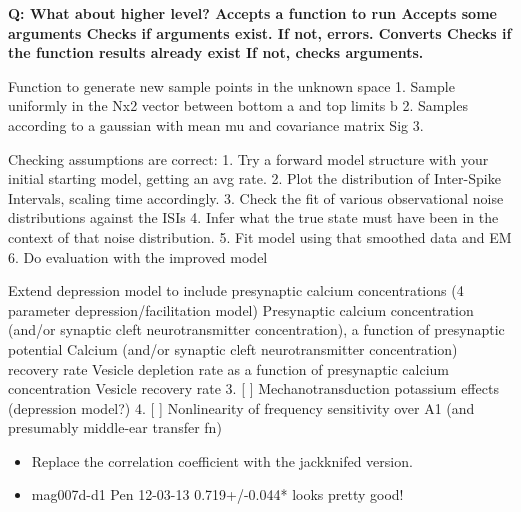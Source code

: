 \documentclass{article}
\newenvironment{qanda}{\setlength{\parindent}{0pt}}{\bigskip}
\newcommand{\Q}{\bigskip\bfseries Q: }
\begin{document}
\begin{qanda}
\Q What about higher level?
     Accepts a function to run
     Accepts some arguments
     Checks if arguments exist. If not, errors. 
     Converts 
     Checks if the function results already exist
     If not, checks arguments.
   
Function to generate new sample points in the unknown space
1. Sample uniformly in the Nx2 vector between bottom a and top limits b
2. Samples according to a gaussian with mean mu and covariance matrix Sig
3.  

Checking assumptions are correct:
   1. Try a forward model structure with your initial starting model, getting an avg rate. 
   2. Plot the distribution of Inter-Spike Intervals, scaling time accordingly.
   3. Check the fit of various observational noise distributions against the ISIs
   4. Infer what the true state must have been in the context of that noise distribution.
   5. Fit model using that smoothed data and EM
   6. Do evaluation with the improved model




\end{qanda}

 Extend depression model to include presynaptic calcium concentrations (4 parameter depression/facilitation model)
          Presynaptic calcium concentration (and/or synaptic cleft neurotransmitter concentration), a function of presynaptic potential
	  Calcium (and/or synaptic cleft neurotransmitter concentration) recovery rate
	  Vesicle depletion rate as a function of presynaptic calcium concentration
	  Vesicle recovery rate 
   3. [ ] Mechanotransduction potassium effects (depression model?)
   4. [ ] Nonlinearity of frequency sensitivity over A1 (and presumably middle-ear transfer fn)

\begin{itemize}
\item Replace the correlation coefficient with the jackknifed version.
\item mag007d-d1 	Pen 	12-03-13 	0.719+/-0.044* looks pretty good!
\end{itemize}
\end{document}
